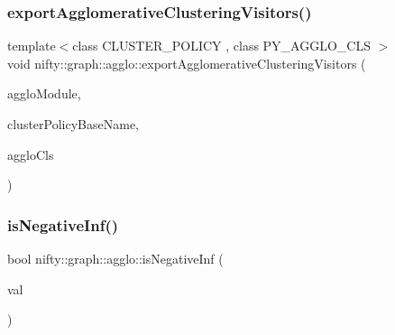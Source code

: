 \mbox{\label{namespacenifty_1_1graph_1_1agglo_a4f7f64daedf9d50119ccf491a948f309}} 
\subsubsection{\texorpdfstring{export\+Agglomerative\+Clustering\+Visitors()}{exportAgglomerativeClusteringVisitors()}}
{\footnotesize\ttfamily template$<$class C\+L\+U\+S\+T\+E\+R\+\_\+\+P\+O\+L\+I\+CY , class P\+Y\+\_\+\+A\+G\+G\+L\+O\+\_\+\+C\+LS $>$ \\
void nifty\+::graph\+::agglo\+::export\+Agglomerative\+Clustering\+Visitors (\begin{DoxyParamCaption}\item[{py\+::module \&}]{agglo\+Module,  }\item[{const std\+::string \&}]{cluster\+Policy\+Base\+Name,  }\item[{P\+Y\+\_\+\+A\+G\+G\+L\+O\+\_\+\+C\+LS \&}]{agglo\+Cls }\end{DoxyParamCaption})}

\mbox{\label{namespacenifty_1_1graph_1_1agglo_a20068bfcbc3173c0d9da085bfb0b4b23}} 
\subsubsection{\texorpdfstring{is\+Negative\+Inf()}{isNegativeInf()}}
{\footnotesize\ttfamily bool nifty\+::graph\+::agglo\+::is\+Negative\+Inf (\begin{DoxyParamCaption}\item[{const double}]{val }\end{DoxyParamCaption})\hspace{0.3cm}{\ttfamily [inline]}}

